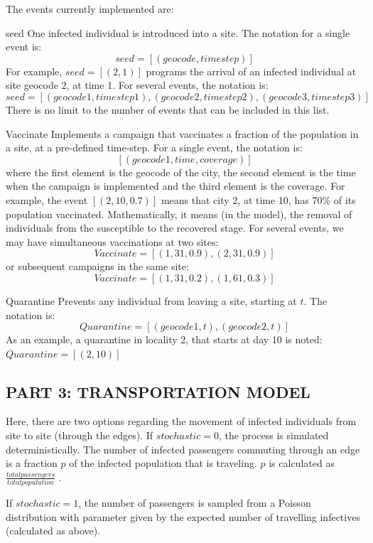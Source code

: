 The events currently implemented are:
\begin{description}
\item{seed} One infected individual is introduced into a site. The notation for a single event is:
$$seed = [(geocode,time step)]$$
For example, $seed = [(2,1)]$ programs the arrival of an infected individual at site geocode 2, at time 1. 
For several events, the notation is:
$$seed = [(geocode1,time step1),(geocode2,time step2),(geocode3,time step3)]$$
There is no limit to the number of events that can be included in this list.
\item{Vaccinate} Implements a campaign that vaccinates a fraction of the population in a site, at a pre-defined time-step. For a single event, the notation is:
$$[(geocode1, time, coverage)]$$
where the first element is the geocode of the city, the second element is the time when the campaign is implemented and the third element is the coverage. For example, the event $[(2,10,0.7)]$ means that city 2, at time 10, has 70\% of its population vaccinated. Mathematically, it means (in the model), the removal of individuals from the susceptible to the recovered stage.
For several events, we may have simultaneous vaccinations at two sites:
$$Vaccinate = [(1, 31, 0.9),(2,31,0.9)]$$ 
or subsequent campaigns in the same site:
$$Vaccinate = [(1, 31, 0.2),(1,61,0.3)]$$ 
\item{Quarantine} Prevents any individual from leaving a site, starting at $t$. The notation is:
$$Quarantine = [(geocode1,t),(geocode2,t)]$$
As an example, a quarantine in locality 2, that starts at day 10 is noted:
$Quarantine = [(2,10)]$
\end{description}

\subsection{PART 3: TRANSPORTATION MODEL}

Here, there are two options regarding the movement of infected individuals from site to site (through the edges). If $stochastic = 0$, the process is simulated deterministically. The number of infected passengers commuting through an edge is a fraction $p$ of the infected population that is traveling. $p$ is calculated as $\frac{total passengers}{total population}$ . 

If $stochastic = 1$, the number of passengers is sampled from a Poisson distribution with parameter given by the expected number of travelling infectives (calculated as above).  

